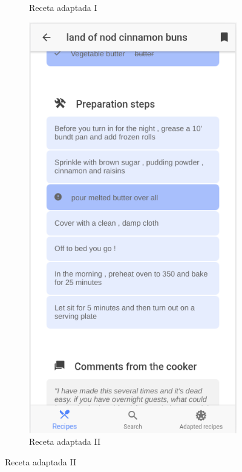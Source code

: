\begin{figure}[H]
\begin{subfigure}[b]{0.32\linewidth}
        \caption{Receta adaptada I}
        \label{fig:app_8}
    \end{subfigure}
    \begin{subfigure}[b]{0.32\linewidth}
        \includegraphics[width=\linewidth]{imagenes/app/pantallas/app_9.png}
        \caption{Receta adaptada II}

\end{subfigure}
\end{figure}
